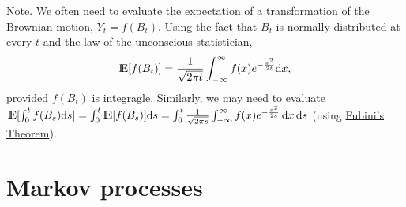 \documentclass[a4paper,10pt]{scrbook}
\begin{document}
Note. We often need to evaluate the expectation of a transformation of the Brownian motion, 
$Y_t = f(B_t)$. Using the fact that $B_t$ is 
\hyperlink{link:normal-distribution}{normally distributed} at every $t$ and the 
\hyperlink{link:lotus}{law of the unconscious statistician}, 
\[
 \E[f(B_t)] = \frac{1}{\sqrt{2\pi t}}\int_{-\infty}^{\infty}f(x)e^{-\frac{x^2}{2t}}\d x,
\]
provided $f(B_t)$ is integragle. 
Similarly, we may need to evaluate $\E[\int_0^t f(B_s)\d s] = \int_0^t \E[f(B_s)]\d s
= \int_0^t \frac{1}{\sqrt{2 \pi s}}\int_{-\infty}^{\infty}f(x) e^{-\frac{x^2}{2s}}\, \d x\, \d s$
(using \hyperlink{link:fubini}{Fubini's Theorem}).


\section{Markov processes}
\end{document}
